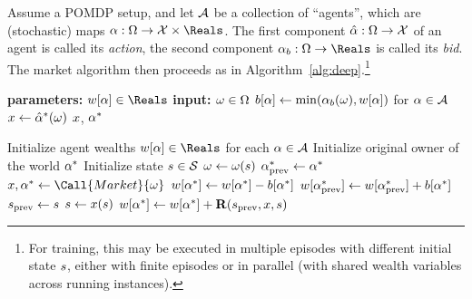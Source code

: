 \begin{definition}
Assume a POMDP setup, and let $\mathcal{A}$ be a collection of ``agents'', which are (stochastic) maps $\agent:\obss\to\actions\times\Reals$. The first component $\hat{\alpha}:\Omega\to\mathcal{X}$ of an agent is called its \emph{action}, the second component $\agentbid:\obss\to\Reals$ is called its \emph{bid}. The market algorithm then proceeds as in Algorithm~\ref{alg:deep}.\footnote{For training, this may be executed in multiple episodes with different initial state $s$, either with finite episodes or in parallel (with shared wealth variables across running instances).}

\begin{algorithm}[tb]
\caption{Deep market}
\label{alg:deep}
\begin{algorithmic}

\State \textbf{parameters: } $\wealth [\agent]\in\Reals$ 
\State \textbf{input: $\omega\in\Omega$}
\State $b[\alpha]\gets\min({\alpha}_b(\omega),w[\alpha])$ for $\alpha\in\mathcal{A}$
\State $x\gets \hat{\alpha}^*(\omega)$
\State \Return $x$, $\alpha^*$
\EndProcedure

\State Initialize agent wealths $\wealth [\agent]\in\Reals$ for each $\alpha\in\mathcal{A}$
\State Initialize original owner of the world $\alpha^*$
\State Initialize state $s\in\mathcal{S}$
\State $\omega\gets\omega(s)$
\State $\alpha^*_{\text{prev}}\gets\alpha^*$
\State $\action, \agent^*\gets \Call{Market}{\obs}$
\State $w[\alpha^*]\gets w[\alpha^*]-b[\alpha^*]$
\State $w[\alpha^*_{\text{prev}}]\gets w[\alpha^*_{\text{prev}}]+b[\alpha^*]$
\State $s_{\text{prev}}\gets s$
\State $s\gets x(s)$
\State $w[\alpha^*]\gets w[\alpha^*]+\mathbf{R}(s_{\text{prev}},x,s)$
\EndWhile
\EndProcedure
\end{algorithmic}
\end{algorithm}

\label{def:deep}
\end{definition}

